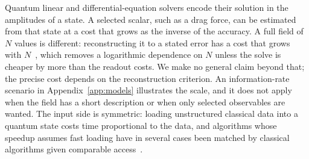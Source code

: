 Quantum linear and differential-equation solvers encode their solution in the amplitudes of a state. A selected scalar, such as a drag force, can be estimated from that state at a cost that grows as the inverse of the accuracy. A full field of $N$ values is different: reconstructing it to a stated error has a cost that grows with $N$~\cite{aaronson2015}, which removes a logarithmic dependence on $N$ unless the solve is cheaper by more than the readout costs. We make no general claim beyond that; the precise cost depends on the reconstruction criterion. An information-rate scenario in Appendix~\ref{app:models} illustrates the scale, and it does not apply when the field has a short description or when only selected observables are wanted. The input side is symmetric: loading unstructured classical data into a quantum state costs time proportional to the data, and algorithms whose speedup assumes fast loading have in several cases been matched by classical algorithms given comparable access~\cite{tang2021,tang2023}.
